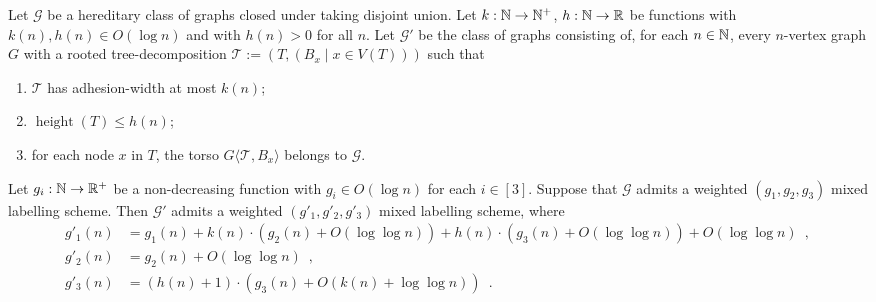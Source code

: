 \documentclass{patmorin}
\renewcommand{\le}{\leqslant}
\newcommand{\torso}[2]{{#1}\langle{#2}\rangle}
\DeclareMathOperator{\height}{height}
\newcommand{\Oh}{O}
\begin{document}
\begin{lem}\label{small_height}
  Let $\mathcal{G}$ be a hereditary class of graphs closed under taking disjoint union. Let $k:\mathbb{N}\to\mathbb{N}^+$,  $h:\mathbb{N}\to\mathbb{R}$ be functions with $k(n),h(n)\in \Oh(\log n)$ and with $h(n)>0$ for all $n$.   Let $\mathcal{G}'$ be the class of graphs consisting of, for each $n\in\mathbb{N}$, every $n$-vertex graph $G$ with a rooted tree-decomposition $\mathcal{T}:=(T,(B_x \mid x\in V(T)))$ such that
  \begin{enumerate}[nosep,nolistsep,label=(\rm{\roman*)}]
    \item $\mathcal{T}$ has adhesion-width at most $k(n)$;
    \item $\height(T)\le h(n)$;
    \item for each node $x$ in $T$, the torso $\torso{G}{\mathcal{T},B_x}$ belongs to $\mathcal{G}$.
  \end{enumerate}
  Let $g_i:\mathbb{N}\to\mathbb{R}^+$ be a non-decreasing function  with $g_i\in\Oh(\log n)$ for each $i\in[3]$. Suppose that $\mathcal{G}$ admits a weighted $(g_1,g_2,g_3)$ mixed labelling scheme. Then $\mathcal{G}'$ admits a weighted $(g'_1,g'_2,g'_3)$ mixed labelling scheme, where
  \begin{align*}
    g'_1(n)
     & = g_1(n)
    + k(n)\cdot (g_2(n)+\Oh(\log\log n))
    + h(n)\cdot (g_3(n)+\Oh(\log\log n)) +\Oh(\log\log n)\enspace, \\
    g'_2(n)
     & = g_2(n) + \Oh(\log\log n)\enspace,                         \\
    g'_3(n)
     & = (h(n)+1)\cdot (g_3(n)+\Oh(k(n)+\log\log n))\enspace.
  \end{align*}
\end{lem}
\end{document}
